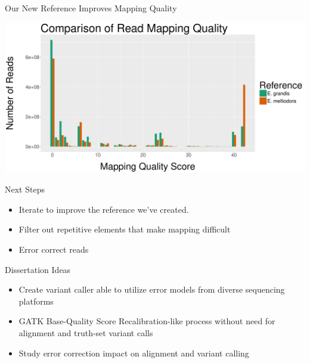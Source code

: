 \documentclass{beamer}
\begin{document}
\begin{frame}{Our New Reference Improves Mapping Quality}
\begin{center}
\includegraphics[width=.95\linewidth]{both_hist.pdf}
\end{center}
\end{frame}





\begin{frame}{Next Steps}
\begin{itemize}
\item Iterate to improve the reference we've created.
\item Filter out repetitive elements that make mapping difficult
\item Error correct reads
\end{itemize}
\end{frame}

\begin{frame}{Dissertation Ideas}
\begin{itemize}
\item Create variant caller able to utilize error models from diverse sequencing platforms
\item GATK Base-Quality Score Recalibration-like process without need for alignment and truth-set variant calls
\item Study error correction impact on alignment and variant calling
\end{itemize}
\end{frame}
\end{document}
